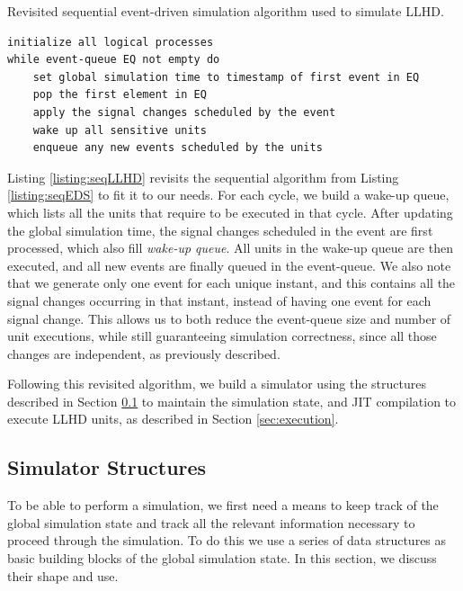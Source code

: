 \begin{listing}[ht]
    \caption{Revisited sequential event-driven simulation algorithm used to simulate LLHD.}
    \label{listing:seqLLHD}
    \begin{verbatim}
initialize all logical processes
while event-queue EQ not empty do
    set global simulation time to timestamp of first event in EQ
    pop the first element in EQ
    apply the signal changes scheduled by the event
    wake up all sensitive units
    enqueue any new events scheduled by the units
\end{verbatim}
\end{listing}

Listing \ref{listing:seqLLHD} revisits the sequential algorithm from Listing \ref{listing:seqEDS} to fit it to our needs. For each cycle, we build a wake-up queue, which lists all the units that require to be executed in that cycle. After updating the global simulation time, the signal changes scheduled in the event are first processed, which also fill \textit{wake-up queue}. All units in the wake-up queue are then executed, and all new events are finally queued in the event-queue. We also note that we generate only one event for each unique instant, and this contains all the signal changes occurring in that instant, instead of having one event for each signal change. This allows us to both reduce the event-queue size and number of unit executions, while still guaranteeing simulation correctness, since all those changes are independent, as previously described.

Following this revisited algorithm, we build a simulator using the structures described in Section \ref{sec:structs} to maintain the simulation state, and JIT compilation to execute LLHD units, as described in Section \ref{sec:execution}.


\subsection{Simulator Structures}
\label{sec:structs}
To be able to perform a simulation, we first need a means to keep track of the global simulation state and track all the relevant information necessary to proceed through the simulation. To do this we use a series of data structures as basic building blocks of the global simulation state. In this section, we discuss their shape and use.

